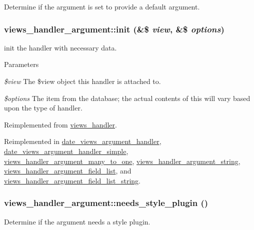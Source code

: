\label{classviews__handler__argument_abfc79c3b710372accd054b73bbb7b373}
Determine if the argument is set to provide a default argument. \hypertarget{classviews__handler__argument_a2c7e59a9df090d59d9d7d2827b6da85a}{
\subsubsection[{init}]{\setlength{\rightskip}{0pt plus 5cm}views\_\-handler\_\-argument::init (\&\$ {\em view}, \/  \&\$ {\em options})}}
\label{classviews__handler__argument_a2c7e59a9df090d59d9d7d2827b6da85a}
init the handler with necessary data. 
\begin{DoxyParams}{Parameters}
\item[{\em \$view}]The \$view object this handler is attached to. \item[{\em \$options}]The item from the database; the actual contents of this will vary based upon the type of handler. \end{DoxyParams}


Reimplemented from \hyperlink{classviews__handler_aa7df174ffa94ab095f7b9fdf154bcc30}{views\_\-handler}.

Reimplemented in \hyperlink{classdate__views__argument__handler_a8dd865de550c6c5d34ab8aea1d3ba204}{date\_\-views\_\-argument\_\-handler}, \hyperlink{classdate__views__argument__handler__simple_afa0fa54cf00568c919af125b94c01ede}{date\_\-views\_\-argument\_\-handler\_\-simple}, \hyperlink{classviews__handler__argument__many__to__one_aec928c8a20acec1623938ab177dbfc8f}{views\_\-handler\_\-argument\_\-many\_\-to\_\-one}, \hyperlink{classviews__handler__argument__string_a504dc70451721c2b9ccae44240d13e2e}{views\_\-handler\_\-argument\_\-string}, \hyperlink{classviews__handler__argument__field__list_ad0fd51038ca7c41ddd7f63715cb3c733}{views\_\-handler\_\-argument\_\-field\_\-list}, and \hyperlink{classviews__handler__argument__field__list__string_a3f56fc3681ce2363758ab69821b74885}{views\_\-handler\_\-argument\_\-field\_\-list\_\-string}.\hypertarget{classviews__handler__argument_a2c09abe1e98de7438ca0701a14b00861}{
\subsubsection[{needs\_\-style\_\-plugin}]{\setlength{\rightskip}{0pt plus 5cm}views\_\-handler\_\-argument::needs\_\-style\_\-plugin ()}}
\label{classviews__handler__argument_a2c09abe1e98de7438ca0701a14b00861}
Determine if the argument needs a style plugin.

